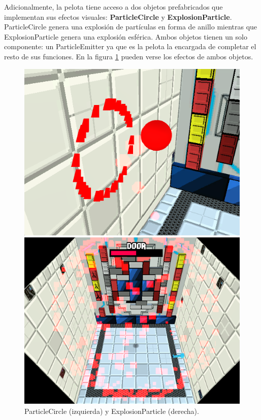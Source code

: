 Adicionalmente, la pelota tiene acceso a dos objetos prefabricados que implementan sus efectos visuales: \textbf{ParticleCircle} y \textbf{ExplosionParticle}. ParticleCircle genera una explosión de partículas en forma de anillo mientras que ExplosionParticle genera una explosión esférica. Ambos objetos tienen un solo componente: un ParticleEmitter ya que es la pelota la encargada de completar el resto de sus funciones. En la figura \ref{particles} pueden verse los efectos de ambos objetos.
\begin{figure}[!htb]
   \begin{minipage}{0.49\textwidth}
     \centering
     \includegraphics[width=0.9\linewidth, right]{images/estructura/fisica/ball_hit}
   \end{minipage}\hfill
   \begin {minipage}{0.49\textwidth}
     \centering
     \includegraphics[width=0.9\linewidth, left]{images/estructura/fisica/ball_explosion}
   \end{minipage}
   \caption{ParticleCircle (izquierda) y ExplosionParticle (derecha).}
   \label{particles}
\end{figure}

